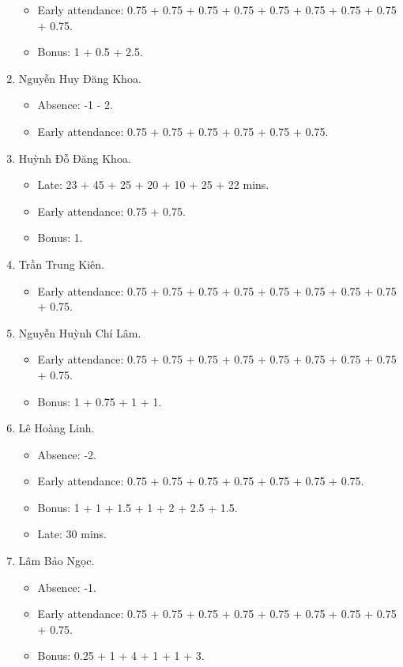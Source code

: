 \documentclass{article}
\begin{document}
\begin{enumerate}
\begin{itemize}
		\item Early attendance: 0.75 + 0.75 + 0.75 + 0.75 + 0.75 + 0.75 + 0.75 + 0.75 + 0.75.
		\item Bonus: 1 + 0.5 + 2.5.
	\end{itemize}
	\item {\sc Nguyễn Huy Đăng Khoa.}
	\begin{itemize}
		\item Absence: -1 - 2.
		\item Early attendance: 0.75 + 0.75 + 0.75 + 0.75 + 0.75 + 0.75.
	\end{itemize}
	\item {\sc Huỳnh Đỗ Đăng Khoa.}
	\begin{itemize}
		\item Late: 23 + 45 + 25 + 20 + 10 + 25 + 22 mins.
		\item Early attendance: 0.75 + 0.75.
        \item Bonus: 1.
	\end{itemize}
	\item {\sc Trần Trung Kiên.}
	\begin{itemize}
		\item Early attendance: 0.75 + 0.75 + 0.75 + 0.75 + 0.75 + 0.75 + 0.75 + 0.75 + 0.75.
	\end{itemize}
	\item {\sc Nguyễn Huỳnh Chí Lâm.}
	\begin{itemize}
		\item Early attendance: 0.75 + 0.75 + 0.75 + 0.75 + 0.75 + 0.75 + 0.75 + 0.75 + 0.75.
		\item Bonus: 1 + 0.75 + 1 + 1.
	\end{itemize}
	\item {\sc Lê Hoàng Linh.}
	\begin{itemize}
        \item Absence: -2.
		\item Early attendance: 0.75 + 0.75 + 0.75 + 0.75 + 0.75 + 0.75 + 0.75.
		\item Bonus: 1 + 1 + 1.5 + 1 + 2 + 2.5 + 1.5.
		\item Late: 30 mins.
	\end{itemize}
	\item {\sc Lâm Bảo Ngọc.}
	\begin{itemize}
		\item Absence: -1.
		\item Early attendance: 0.75 + 0.75 + 0.75 + 0.75 + 0.75 + 0.75 + 0.75 + 0.75 + 0.75.
		\item Bonus: 0.25 + 1 + 4 + 1 + 1 + 3.

\end{itemize}
\end{enumerate}
\end{document}
